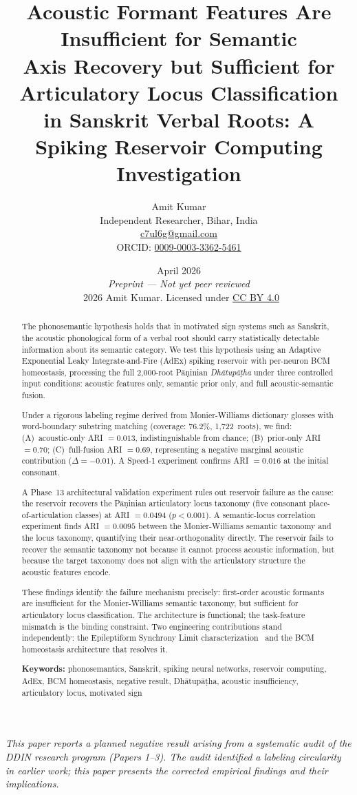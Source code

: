 \documentclass{article}
\title{\textbf{Acoustic Formant Features Are Insufficient for Semantic\\
Axis Recovery but Sufficient for Articulatory Locus Classification\\
in Sanskrit Verbal Roots: A Spiking Reservoir Computing Investigation}}
\author{Amit Kumar\\
\small Independent Researcher, Bihar, India\\
\small \href{mailto:c7ul6g@gmail.com}{c7ul6g@gmail.com}\\[4pt]
\small ORCID: \href{https://orcid.org/0009-0003-3362-5461}{0009-0003-3362-5461}}
\date{%
  April 2026\\[4pt]
  \small\textit{Preprint — Not yet peer reviewed}\\[2pt]
  \small\textcopyright\ 2026 Amit Kumar. Licensed under
  \href{https://creativecommons.org/licenses/by/4.0/}{CC BY 4.0}%
}
\begin{document}
\maketitle

\begin{center}
\small\textit{This paper reports a planned negative result arising from
a systematic audit of the DDIN research program (Papers 1--3). The audit
identified a labeling circularity in earlier work; this paper presents
the corrected empirical findings and their implications.}
\end{center}

\begin{abstract}
The phonosemantic hypothesis holds that in motivated sign systems such
as Sanskrit, the acoustic phonological form of a verbal root should carry
statistically detectable information about its semantic category. We test
this hypothesis using an Adaptive Exponential Leaky Integrate-and-Fire
(AdEx) spiking reservoir with per-neuron BCM homeostasis, processing the
full 2,000-root Pāṇinian \textit{Dhātupāṭha} under three controlled
input conditions: acoustic features only, semantic prior only, and full
acoustic-semantic fusion.

Under a rigorous labeling regime derived from Monier-Williams dictionary
glosses with word-boundary substring matching (coverage: 76.2\%,
1,722~roots), we find: (A)~acoustic-only ARI $= 0.013$, indistinguishable
from chance; (B)~prior-only ARI $= 0.70$; (C)~full-fusion ARI $= 0.69$,
representing a negative marginal acoustic contribution ($\Delta = -0.01$).
A Speed-1 experiment confirms ARI $= 0.016$ at the initial consonant.

A Phase~13 architectural validation experiment rules out reservoir failure
as the cause: the reservoir recovers the Pāṇinian articulatory locus
taxonomy (five consonant place-of-articulation classes) at ARI $= 0.0494$
($p < 0.001$). A semantic-locus correlation experiment finds ARI $= 0.0095$
between the Monier-Williams semantic taxonomy and the locus taxonomy,
quantifying their near-orthogonality directly. The reservoir fails to
recover the semantic taxonomy not because it cannot process acoustic
information, but because the target taxonomy does not align with the
articulatory structure the acoustic features encode.

These findings identify the failure mechanism precisely: first-order
acoustic formants are insufficient for the Monier-Williams semantic
taxonomy, but sufficient for articulatory locus classification. The
architecture is functional; the task-feature mismatch is the binding
constraint. Two engineering contributions stand independently: the
Epileptiform Synchrony Limit characterization~\citep{kumar2026esl} and
the BCM homeostasis architecture that resolves it.

\smallskip
\noindent\textbf{Keywords:} phonosemantics, Sanskrit, spiking neural
networks, reservoir computing, AdEx, BCM homeostasis, negative result,
Dhātupāṭha, acoustic insufficiency, articulatory locus, motivated sign
\end{abstract}
\end{document}

